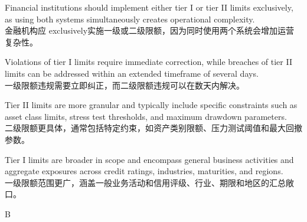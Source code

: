 \documentclass{article}
\begin{document}
\begin{choices}
    \item Financial institutions should implement either tier I or tier II limits exclusively, as using both systems simultaneously creates operational complexity.\\
    金融机构应 exclusively实施一级或二级限额，因为同时使用两个系统会增加运营复杂性。
    
    \item Violations of tier I limits require immediate correction, while breaches of tier II limits can be addressed within an extended timeframe of several days.\\
    一级限额违规需要立即纠正，而二级限额违规可以在数天内解决。
    
    \item Tier II limits are more granular and typically include specific constraints such as asset class limits, stress test thresholds, and maximum drawdown parameters.\\
    二级限额更具体，通常包括特定约束，如资产类别限额、压力测试阈值和最大回撤参数。
    
    \item Tier I limits are broader in scope and encompass general business activities and aggregate exposures across credit ratings, industries, maturities, and regions.\\
    一级限额范围更广，涵盖一般业务活动和信用评级、行业、期限和地区的汇总敞口。
\end{choices}


\begin{correctanswer}
    B
\end{correctanswer}
\end{document}
